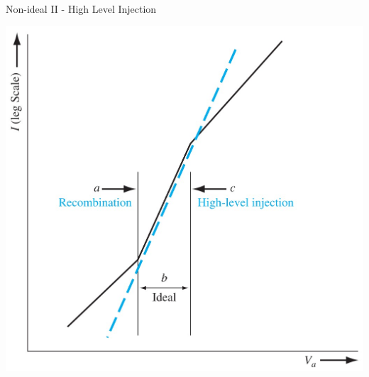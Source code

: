 \documentclass[a4paper, twocolumn]{article}
\begin{document}
    \par Non-ideal II - High Level Injection \\
    \begin{center}
        \includegraphics[width=0.6\linewidth]{High-level-injection.jpg} \\
    \end{center}
    
\end{document}
